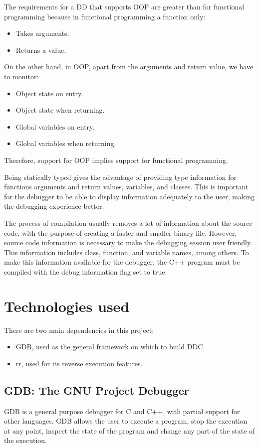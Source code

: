 The requirements for a DD that supports OOP are greater than for functional programming because in functional programming a function only:
\begin{itemize}
    \item Takes arguments.
    \item Returns a value.
\end{itemize}
On the other hand, in OOP, apart from the arguments and return value, we have to monitor:
\begin{itemize}
    \item Object state on entry.
    \item Object state when returning.
    \item Global variables on entry.
    \item Global variables when returning.
\end{itemize}
Therefore, support for OOP implies support for functional programming.

Being statically typed gives the advantage of providing type information for functions arguments and return values, variables, and classes. This is important for the debugger to be able to display information adequately to the user, making the debugging experience better.

The process of compilation usually removes a lot of information about the source code, with the purpose of creating a faster and smaller binary file.
However, source code information is necessary to make the debugging session user friendly. This information includes class, function, and variable names, among others.
To make this information available for the debugger, the C++ program must be compiled with the debug information flag set to true.

\section{Technologies used}
There are two main dependencies in this project:
\begin{itemize}
    \item GDB, used as the general framework on which to build DDC.
    \item rr, used for its reverse execution features.
\end{itemize}
\subsection{GDB: The GNU Project Debugger}
GDB \cite{gdb} is a general purpose debugger for C and C++, with partial support for other languages. GDB allows the user to execute a program, stop the execution at any point, inspect the state of the program and change any part of the state of the execution.

